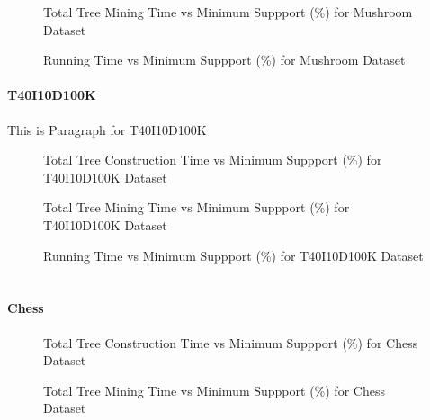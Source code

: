 			\begin{figure}
			\centering
				
			\caption{Total Tree Mining Time vs Minimum Suppport (\%) for Mushroom Dataset ~\cite{dataset}}
			\label{result:g_m_mining_total}
			\end{figure}
			
			\begin{figure}
			\centering
				
			\caption{Running Time vs Minimum Suppport (\%) for Mushroom Dataset ~\cite{dataset}}
			\label{result:g_m_total}
			\end{figure}
					
		\paragraph{T40I10D100K}
		This is Paragraph for T40I10D100K
			\begin{figure}[h]
			\centering
				
			\caption{Total Tree Construction Time vs Minimum Suppport (\%) for T40I10D100K Dataset ~\cite{dataset}}
			\label{result:g_t10_tree_construction_total}
			\end{figure}
			
			\begin{figure}
			\centering
				
			\caption{Total Tree Mining Time vs Minimum Suppport (\%) for T40I10D100K Dataset ~\cite{dataset}}
			\label{result:g_t10_mining_total}
			\end{figure}
			
			\begin{figure}
			\centering
				
			\caption{Running Time vs Minimum Suppport (\%) for T40I10D100K Dataset ~\cite{dataset}}
			\label{result:g_t10_total}
			\end{figure}
		
		\paragraph{Chess}
		
			\begin{figure}[h]
			\centering
				
			\caption{Total Tree Construction Time vs Minimum Suppport (\%) for Chess Dataset ~\cite{dataset}}
			\label{result:g_chess_tree_construction_total}
			\end{figure}
			
			\begin{figure}
			\centering
				
			\caption{Total Tree Mining Time vs Minimum Suppport (\%) for Chess Dataset ~\cite{dataset}}
			\label{result:g_chess_mining_total}
			\end{figure}
			

